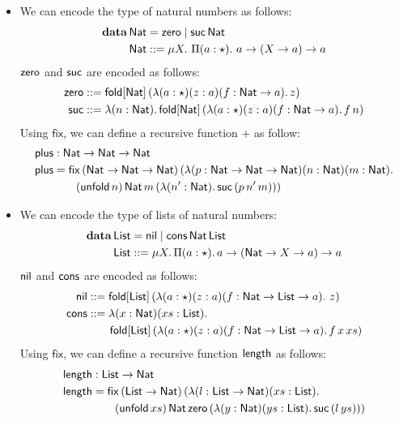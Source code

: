 \begin{itemize}
\item We can encode the type of natural numbers as follows:
  \begin{align*}
    \data\,\Nat &= \zero \mid \suc\,\Nat \\
    \Nat &::= \mu X.\ \Pi(a : \star).\ a \rightarrow (X \rightarrow a) \rightarrow a    
  \end{align*}
  $\zero$ and $\suc$ are encoded as follows:
  \begin{align*}
    \zero &::= \fold{\Nat}{(\lambda (a : \star) (z : a) (f : \Nat \rightarrow a).\,z)}\\
    \suc &::= \lambda (n : \Nat).\,\fold{\Nat}{(\lambda (a : \star) (z : a) (f : \Nat \rightarrow a).\,f\,n)}
  \end{align*}
  Using $\mathsf{fix}$, we can define a recursive function $\plus$ as
  follow:
  \begin{align*}
    \plus &:\PlFunc\\
    \plus &=\mathsf{fix}\,(\PlFunc)\,(\lambda(p : \PlFunc)(n : \Nat)(m : \Nat).\\
          &\qquad (\unfold[\Nat]{n})\,\Nat\,m\,(\lambda (n^{\prime} : \Nat).\,\suc\,(p\,n^{\prime}\,m)))
  \end{align*}
\item We can encode the type of lists of natural numbers:
  \begin{align*}
    \data\,\List &= \nil \mid \cons\,\Nat\,\List \\
    \List &::= \mu X.\,\Pi(a : \star).\,a \rightarrow (\Nat \rightarrow X \rightarrow a) \rightarrow a    
  \end{align*}
  $\nil$ and $\cons$ are encoded as follows:
  \begin{align*}
    \nil &::= \fold{\List}{(\lambda (a : \star) (z : a) (f : \Nat \rightarrow \List \rightarrow a).\ z)}\\
    \cons &::= \lambda(x : \Nat)(xs : \List).\\
         &\qquad \fold{\List}{(\lambda(a : \star)(z : a)(f : \Nat\rightarrow \List \rightarrow a).\,f\,x\,xs)}
  \end{align*}
  Using $\mathsf{fix}$, we can define a recursive function $\length$
  as follows:
  \begin{align*}
    \length &: \List \rightarrow \Nat\\
    \length &= \mathsf{fix}\,(\List \rightarrow \Nat)\,(\lambda(l : \List
              \rightarrow \Nat)(xs : \List).\\
            &\qquad (\unfold[\List]{xs})\,\Nat\,\zero\,(\lambda(y : \Nat)(ys : \List).\,\suc\,(l\,ys)))
  \end{align*}
\end{itemize}

